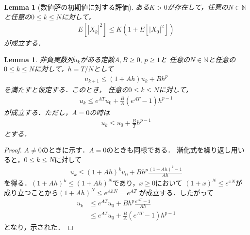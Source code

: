 \documentclass[dvipdfmx,autodetect-engine]{jsarticle}
\newtheorem{lemma}[theorem]{Lemma}
\theoremstyle{remark}
\theoremstyle{definition}
\newcommand{\N}{\mathbb{N}}
\newcommand{\abs}[1]{\left\lvert#1\right\rvert}
\begin{document}
\begin{lemma}[数値解の初期値に対する評価]
    ある$K>0$が存在して，任意の$N \in \N$と任意の$0\leq k\leq N$に対して，
    \begin{align}
        E[\abs{\bar{X}_{k}}^{2}] \leq K(1+E[\abs{X_{0}}^{2}])
    \end{align}
    が成立する．
\end{lemma}


\begin{lemma}
    非負実数列$u_{k}$がある定数$A,B\geq 0,\,p\geq 1$と
    任意の$N \in \N$と任意の$0\leq k\leq N$に対して，$h = T/N$として
    \begin{align}
        u_{k+1} \leq (1+Ah)u_{k} + Bh^{p}
    \end{align}
    を満たすと仮定する．このとき，
    任意の$0\leq k\leq N$に対して，
    \begin{align}
        u_{k} \leq e^{AT}u_{0} + \frac{B}{A}(e^{AT}-1)h^{p-1}
    \end{align}
    が成立する．ただし，$A=0$の時は
    \begin{align}
        u_{k} \leq u_{0} + \frac{B}Th^{p-1}
    \end{align}
    とする．
\end{lemma}


\begin{proof}
    $A\neq 0$のときに示す．$A=0$のときも同様である．
    漸化式を繰り返し用いると，$0\leq k\leq N$に対して
    \begin{align}
        u_{k} \leq (1+Ah)^{k}u_{0} + Bh^{p} \frac{(1+Ah)^{k}-1}{Ah}
    \end{align}
    を得る．$(1+Ah)^{k} \leq (1+Ah)^{N}$であり，$x\geq 0$において
    $(1+x)^{N} \leq e^{xN}$が成り立つことから$(1+Ah)^{N} \leq e^{AhN} = e^{AT}$
    が成立する．したがって
    \begin{align}
        u_{k} &\leq e^{AT} u_{0} + Bh^{p} \frac{e^{AT}-1}{Ah} \\
        &\leq e^{AT}u_{0} + \frac{B}{A}(e^{AT}-1)h^{p-1}
    \end{align}
    となり，示された．
\end{proof}
\end{document}
